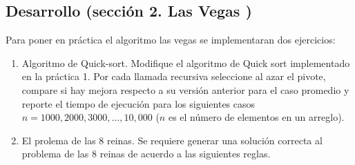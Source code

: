 \documentclass[runningheads,a4paper]{llncs}
\begin{document}
\subsection{Desarrollo (secci\'on 2. Las Vegas )}

Para poner en pr\'actica el algoritmo las vegas se implementaran dos ejercicios:

\begin{enumerate}
	\item Algoritmo de Quick-sort. Modifique el algoritmo de Quick sort implementado en la pr\'actica 1. Por cada llamada recursiva seleccione al azar el pivote, compare si hay mejora respecto  a su versi\'on anterior para el caso promedio y reporte el tiempo de ejecuci\'on para los siguientes casos $n = 1000, 2000, 3000, \ldots, 10,000$ ($n$ es el n\'umero de elementos en un arreglo).
	\item El prolema de las 8 reinas. Se requiere generar una soluci\'on correcta al problema de las 8 reinas de acuerdo a las siguientes reglas.
\end{enumerate}
\end{document}
